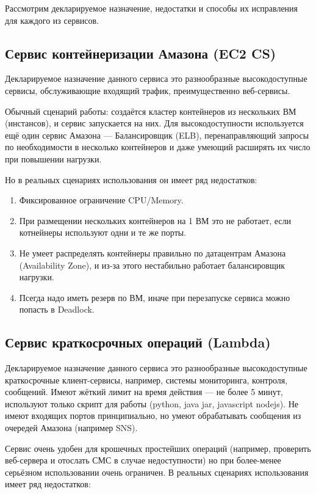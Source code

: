 \documentclass[10pt, a5paper]{article}
\begin{document}
Рассмотрим декларируемое назначение, недостатки и способы их исправления
для каждого из сервисов.

\subsection*{Сервис контейнеризации Амазона (EC2 CS)}

Декларируемое назначение данного сервиса это разнообразные
высокодоступные сервисы, обслуживающие входящий трафик, преимущественно
веб-сервисы.

Обычный сценарий работы: создаётся кластер контейнеров из нескольких ВМ
(инстансов), и сервис запускается на них. Для высокодоступности
используется ещё один сервис Амазона --- Балансировщик (ELB),
перенаправляющий запросы по необходимости в несколько контейнеров и даже
умеющий расширять их число при повышении нагрузки.

Но в реальных сценариях использования он имеет ряд недостатков:

\begin{enumerate}
\item Фиксированное ограничение CPU/Memory.
\item При размещении нескольких контейнеров на 1 ВМ это не работает, если
  котнейнеры используют одни и те же порты.
\item Не умеет распределять контейнеры правильно по датацентрам Амазона
  (Availability Zone), и из-за этого нестабильно работает балансировщик
  нагрузки.
\item Псегда надо иметь резерв по ВМ, иначе при перезапуске сервиса можно
  попасть в Deadlock.
\end{enumerate}


\subsection*{Сервис краткосрочных операций (Lambda)}

Декларируемое назначение данного сервиса это разнообразные
высокодоступные краткосрочные клиент-сервисы, например, системы
мониторинга, контроля, сообщений. Имеют жёткий лимит на время действия
--- не более 5 минут, используют только скрипт для работы (python, java
jar, javascript nodejs). Не имеют входящих портов принципиально, но умеют
обрабатывать сообщения из очередей Амазона (например SNS).

Сервис очень удобен для крошечных простейших операций (например,
проверить веб-сервера и отослать СМС в случае недоступности) но при
более-менее серьёзном использовании очень ограничен. В реальных
сценариях использования имеет ряд недостатков:
\end{document}
